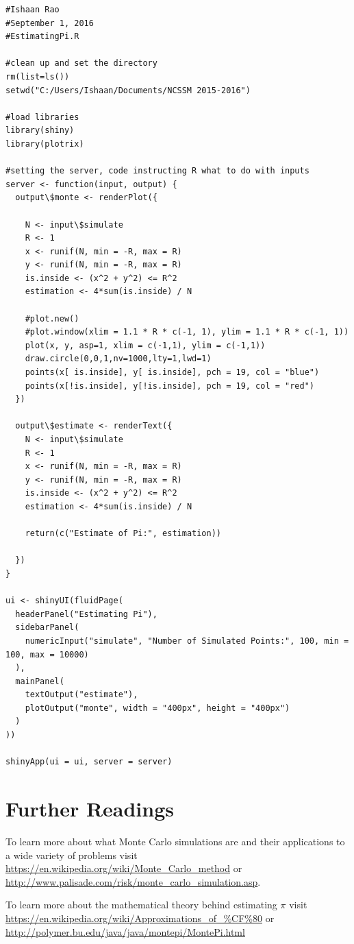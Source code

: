 \begin{lstlisting}
#Ishaan Rao
#September 1, 2016
#EstimatingPi.R

#clean up and set the directory
rm(list=ls())
setwd("C:/Users/Ishaan/Documents/NCSSM 2015-2016")

#load libraries
library(shiny)
library(plotrix)

#setting the server, code instructing R what to do with inputs
server <- function(input, output) {
  output\$monte <- renderPlot({
    
    N <- input\$simulate
    R <- 1
    x <- runif(N, min = -R, max = R)
    y <- runif(N, min = -R, max = R)
    is.inside <- (x^2 + y^2) <= R^2
    estimation <- 4*sum(is.inside) / N
    
    #plot.new()
    #plot.window(xlim = 1.1 * R * c(-1, 1), ylim = 1.1 * R * c(-1, 1))
    plot(x, y, asp=1, xlim = c(-1,1), ylim = c(-1,1))
    draw.circle(0,0,1,nv=1000,lty=1,lwd=1)
    points(x[ is.inside], y[ is.inside], pch = 19, col = "blue")
    points(x[!is.inside], y[!is.inside], pch = 19, col = "red")
  })
  
  output\$estimate <- renderText({
    N <- input\$simulate
    R <- 1
    x <- runif(N, min = -R, max = R)
    y <- runif(N, min = -R, max = R)
    is.inside <- (x^2 + y^2) <= R^2
    estimation <- 4*sum(is.inside) / N
    
    return(c("Estimate of Pi:", estimation))
    
  })
}

ui <- shinyUI(fluidPage(
  headerPanel("Estimating Pi"),
  sidebarPanel(
    numericInput("simulate", "Number of Simulated Points:", 100, min = 100, max = 10000)
  ),
  mainPanel(
    textOutput("estimate"),
    plotOutput("monte", width = "400px", height = "400px")
  )
))

shinyApp(ui = ui, server = server)

\end{lstlisting}

\section{Further Readings}

To learn more about what Monte Carlo simulations are and their applications to a wide variety of problems visit \url{https://en.wikipedia.org/wiki/Monte\_Carlo\_method} or \url{http://www.palisade.com/risk/monte\_carlo\_simulation.asp}.

\noindent To learn more about the mathematical theory behind estimating $\pi$ visit \url{https://en.wikipedia.org/wiki/Approximations_of_\%CF\%80} or \url{http://polymer.bu.edu/java/java/montepi/MontePi.html}
